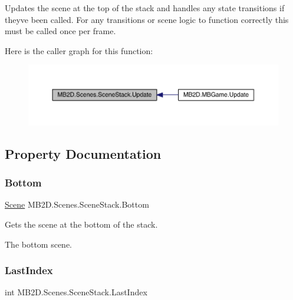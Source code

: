 Updates the scene at the top of the stack and handles any state transitions if they\textquotesingle{}ve been called. For any transitions or scene logic to function correctly this must be called once per frame. 

Here is the caller graph for this function\+:\nopagebreak
\begin{figure}[H]
\begin{center}
\leavevmode
\includegraphics[width=350pt]{class_m_b2_d_1_1_scenes_1_1_scene_stack_a8486b29eb65458e88512989201772984_icgraph}
\end{center}
\end{figure}


\subsection{Property Documentation}
\hypertarget{class_m_b2_d_1_1_scenes_1_1_scene_stack_a916ab93964a454fa69697bef787c79d6}{}\label{class_m_b2_d_1_1_scenes_1_1_scene_stack_a916ab93964a454fa69697bef787c79d6} 
\subsubsection{\texorpdfstring{Bottom}{Bottom}}
{\footnotesize\ttfamily \hyperlink{class_m_b2_d_1_1_scenes_1_1_scene}{Scene} M\+B2\+D.\+Scenes.\+Scene\+Stack.\+Bottom\hspace{0.3cm}{\ttfamily [get]}}



Gets the scene at the bottom of the stack. 

The bottom scene.\hypertarget{class_m_b2_d_1_1_scenes_1_1_scene_stack_a4c0fa3522458fb0d64cee1a54f31d50d}{}\label{class_m_b2_d_1_1_scenes_1_1_scene_stack_a4c0fa3522458fb0d64cee1a54f31d50d} 
\subsubsection{\texorpdfstring{Last\+Index}{LastIndex}}
{\footnotesize\ttfamily int M\+B2\+D.\+Scenes.\+Scene\+Stack.\+Last\+Index\hspace{0.3cm}{\ttfamily [get]}}



